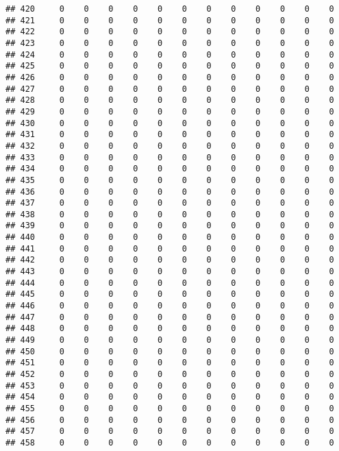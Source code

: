 \documentclass[]{article}
\begin{document}
\begin{verbatim}
## 420     0    0    0    0    0    0    0    0    0    0    0    0
## 421     0    0    0    0    0    0    0    0    0    0    0    0
## 422     0    0    0    0    0    0    0    0    0    0    0    0
## 423     0    0    0    0    0    0    0    0    0    0    0    0
## 424     0    0    0    0    0    0    0    0    0    0    0    0
## 425     0    0    0    0    0    0    0    0    0    0    0    0
## 426     0    0    0    0    0    0    0    0    0    0    0    0
## 427     0    0    0    0    0    0    0    0    0    0    0    0
## 428     0    0    0    0    0    0    0    0    0    0    0    0
## 429     0    0    0    0    0    0    0    0    0    0    0    0
## 430     0    0    0    0    0    0    0    0    0    0    0    0
## 431     0    0    0    0    0    0    0    0    0    0    0    0
## 432     0    0    0    0    0    0    0    0    0    0    0    0
## 433     0    0    0    0    0    0    0    0    0    0    0    0
## 434     0    0    0    0    0    0    0    0    0    0    0    0
## 435     0    0    0    0    0    0    0    0    0    0    0    0
## 436     0    0    0    0    0    0    0    0    0    0    0    0
## 437     0    0    0    0    0    0    0    0    0    0    0    0
## 438     0    0    0    0    0    0    0    0    0    0    0    0
## 439     0    0    0    0    0    0    0    0    0    0    0    0
## 440     0    0    0    0    0    0    0    0    0    0    0    0
## 441     0    0    0    0    0    0    0    0    0    0    0    0
## 442     0    0    0    0    0    0    0    0    0    0    0    0
## 443     0    0    0    0    0    0    0    0    0    0    0    0
## 444     0    0    0    0    0    0    0    0    0    0    0    0
## 445     0    0    0    0    0    0    0    0    0    0    0    0
## 446     0    0    0    0    0    0    0    0    0    0    0    0
## 447     0    0    0    0    0    0    0    0    0    0    0    0
## 448     0    0    0    0    0    0    0    0    0    0    0    0
## 449     0    0    0    0    0    0    0    0    0    0    0    0
## 450     0    0    0    0    0    0    0    0    0    0    0    0
## 451     0    0    0    0    0    0    0    0    0    0    0    0
## 452     0    0    0    0    0    0    0    0    0    0    0    0
## 453     0    0    0    0    0    0    0    0    0    0    0    0
## 454     0    0    0    0    0    0    0    0    0    0    0    0
## 455     0    0    0    0    0    0    0    0    0    0    0    0
## 456     0    0    0    0    0    0    0    0    0    0    0    0
## 457     0    0    0    0    0    0    0    0    0    0    0    0
## 458     0    0    0    0    0    0    0    0    0    0    0    0

\end{verbatim}
\end{document}
